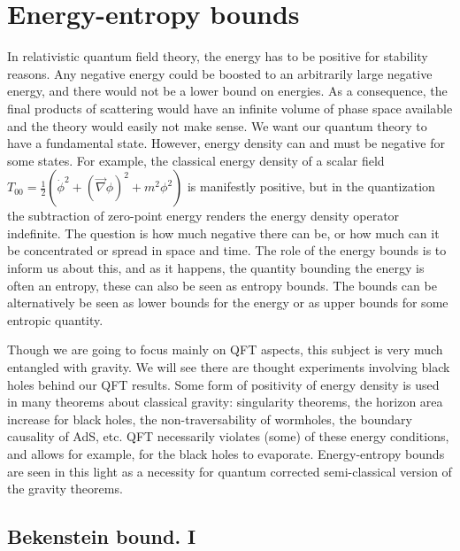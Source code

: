 \documentclass[12pt]{article}
\numberwithin{equation}{section}
\begin{document}
\section{Energy-entropy  bounds}
 In relativistic quantum field theory, the energy has to be positive for stability reasons. Any negative energy could be boosted to an arbitrarily large negative energy, and there would not be a lower bound on energies. As a consequence, the final products of scattering would have an infinite volume of phase space available and the theory would easily not make sense. We want our quantum theory to have a fundamental state. However, energy density can and must be negative for some states. For example, the classical energy density of a scalar field $T_{00}=\frac{1}{2}(\dot{\phi}^2+(\vec{\nabla} \phi)^2+m^2\phi^2)$ is manifestly positive, but in the quantization the subtraction of zero-point energy renders the energy density operator indefinite. 
  The question is how much negative there can be, or how much can it be concentrated or spread in space and time. The role of the energy bounds is to inform us about this, and as it happens, the quantity bounding the energy is often an entropy, these can also be seen as entropy bounds. The bounds can be alternatively be seen as lower bounds for the energy or as upper bounds for some entropic quantity. 
   
Though we are going to focus mainly on QFT aspects, this subject is very much entangled with gravity. We will see there are thought experiments involving black holes behind our QFT results. Some form of positivity of energy density is used in many theorems about classical gravity: singularity theorems, the horizon area increase for black holes, the non-traversability of wormholes, the boundary causality of AdS, etc. 
 QFT necessarily violates (some) of these energy conditions, and allows for example, for the black holes to evaporate. Energy-entropy bounds are seen in this light as a necessity for quantum corrected semi-classical version of the gravity theorems. 
 
   

\subsection{Bekenstein bound. I}
\end{document}
